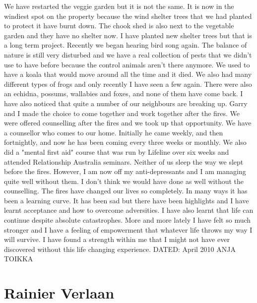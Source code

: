 \documentclass[a4paper]{article}
\begin{document}
        We have restarted the veggie garden but it is not the same. It is now in the windiest spot on the property because the wind shelter trees that we had planted to protect it have burnt down. The chook shed is also next to the vegetable garden and they have no shelter now. I have planted new shelter trees but that is a long term project.
        Recently we began hearing bird song again. The balance of nature is still very disturbed and we have a real collection of pests that we didn't use to have before because the control animals aren't there anymore. We used to have a koala that would move around all the time and it died. We also had many different types of frogs and only recently I have seen a few again. There were also an echidna, possums, wallabies and foxes, and none of them have come back.
        I have also noticed that quite a number of our neighbours are breaking up. Garry and I made the choice to come together and work together after the fires. We were offered counselling after the fires and we took up that opportunity. We have a counsellor who comes to our home. Initially he came weekly, and then fortnightly, and now he has been coming every three weeks or monthly. We also did a "mental first aid" course that was run by Lifeline over six weeks and attended Relationship Australia seminars. Neither of us sleep the way we slept before the fires. However, I am now off my anti-depressants and I am managing quite well without them. I don't think we would have done as well without the counselling.
        The fires have changed our lives so completely. In many ways it has been a learning curve. It has been sad but there have been highlights and I have learnt acceptance and how to overcome adversities. I have also learnt that life can continue despite absolute catastrophes. More and more lately I have felt so much stronger and I have a feeling of empowerment that whatever life throws my way I will survive. I have found a strength within me that I might not have ever discovered without this life changing experience.
    \newline
    \newline
    DATED: April 2010
    \newline
    \newline
    ANJA TOIKKA

\section{Rainier Verlaan}
\end{document}
